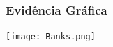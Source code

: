 \documentclass{beamer}
\begin{document}
\begin{frame}[fragile]\frametitle{Evidência Gráfica}
\label{Graf_ev}
	\texttt{[image: Banks.png]}
	\hyperlink{QUAIDS}{}
    
\end{frame}

\begin{frame}[allowframebreaks]



\end{frame}

\end{document}
